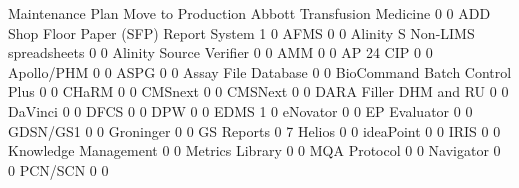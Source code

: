 \documentclass{article}
\begin{document}
\begin{Schunk}
\begin{Soutput}
                                           Maintenance Plan Move to Production
  Abbott Transfusion Medicine                             0                  0
  ADD Shop Floor Paper (SFP) Report System                1                  0
  AFMS                                                    0                  0
  Alinity S Non-LIMS spreadsheets                         0                  0
  Alinity Source Verifier                                 0                  0
  AMM                                                     0                  0
  AP 24 CIP                                               0                  0
  Apollo/PHM                                              0                  0
  ASPG                                                    0                  0
  Assay File Database                                     0                  0
  BioCommand Batch Control Plus                           0                  0
  CHaRM                                                   0                  0
  CMSnext                                                 0                  0
  CMSNext                                                 0                  0
  DARA Filler DHM and RU                                  0                  0
  DaVinci                                                 0                  0
  DFCS                                                    0                  0
  DPW                                                     0                  0
  EDMS                                                    1                  0
  eNovator                                                0                  0
  EP Evaluator                                            0                  0
  GDSN/GS1                                                0                  0
  Groninger                                               0                  0
  GS Reports                                              0                  7
  Helios                                                  0                  0
  ideaPoint                                               0                  0
  IRIS                                                    0                  0
  Knowledge Management                                    0                  0
  Metrics Library                                         0                  0
  MQA Protocol                                            0                  0
  Navigator                                               0                  0
  PCN/SCN                                                 0                  0

\end{Soutput}
\end{Schunk}
\end{document}
